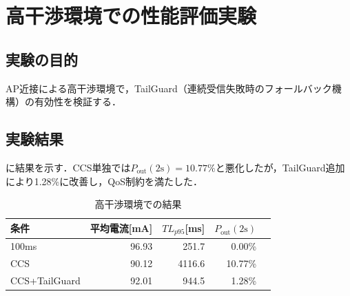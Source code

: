 \section{高干渉環境での性能評価実験}
\label{sec:exp_interference}

\subsection{実験の目的}

AP近接による高干渉環境で，TailGuard（連続受信失敗時のフォールバック機構）の有効性を検証する．

\subsection{実験結果}

に結果を示す．CCS単独では$P_{\mathrm{out}}(2\mathrm{s})=10.77\%$と悪化したが，TailGuard追加により1.28\%に改善し，QoS制約を満たした．

\begin{table}[tb]
  \centering
  \caption{高干渉環境での結果}
  \begin{tabular}{lrrrr}
    \toprule
    条件 & 平均電流[mA] & $TL_{p95}$[ms] & $P_{\mathrm{out}}(2\mathrm{s})$ \\
    \midrule
    100ms & 96.93 & 251.7 & 0.00\% \\
    CCS & 90.12 & 4116.6 & 10.77\% \\
    CCS+TailGuard & 92.01 & 944.5 & 1.28\% \\
    \bottomrule
  \end{tabular}
\end{table}

\clearpage
